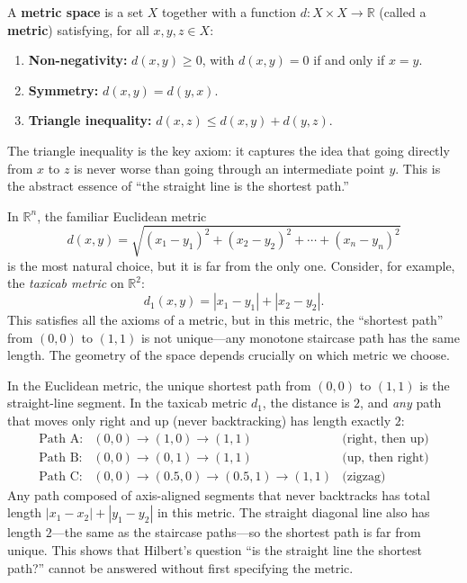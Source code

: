 \begin{definition}
A \textbf{metric space} is a set $X$ together with a function $d : X \times X \to \mathbb{R}$ (called a \textbf{metric}) satisfying, for all $x, y, z \in X$:
\begin{enumerate}
    \item \textbf{Non-negativity:} $d(x,y) \geq 0$, with $d(x,y) = 0$ if and only if $x = y$.
    \item \textbf{Symmetry:} $d(x,y) = d(y,x)$.
    \item \textbf{Triangle inequality:} $d(x,z) \leq d(x,y) + d(y,z)$.
\end{enumerate}
\end{definition}

The triangle inequality is the key axiom: it captures the idea that going directly from $x$ to $z$ is never worse than going through an intermediate point $y$. This is the abstract essence of ``the straight line is the shortest path.''

In $\mathbb{R}^n$, the familiar Euclidean metric
\[
    d(x,y) = \sqrt{(x_1 - y_1)^2 + (x_2 - y_2)^2 + \cdots + (x_n - y_n)^2}
\]
is the most natural choice, but it is far from the only one. Consider, for example, the \emph{taxicab metric} on $\mathbb{R}^2$:
\[
    d_1(x,y) = |x_1 - y_1| + |x_2 - y_2|.
\]
This satisfies all the axioms of a metric, but in this metric, the ``shortest path'' from $(0,0)$ to $(1,1)$ is not unique---any monotone staircase path has the same length. The geometry of the space depends crucially on which metric we choose.

\begin{example}
In the Euclidean metric, the unique shortest path from $(0,0)$ to $(1,1)$ is the straight-line segment. In the taxicab metric $d_1$, the distance is $2$, and \emph{any} path that moves only right and up (never backtracking) has length exactly $2$:
\[
\begin{array}{lll}
\text{Path A:} & (0,0) \to (1,0) \to (1,1) & \text{(right, then up)} \\
\text{Path B:} & (0,0) \to (0,1) \to (1,1) & \text{(up, then right)} \\
\text{Path C:} & (0,0) \to (0.5,0) \to (0.5,1) \to (1,1) & \text{(zigzag)}
\end{array}
\]
Any path composed of axis-aligned segments that never backtracks has total length $|x_1-x_2|+|y_1-y_2|$ in this metric. The straight diagonal line also has length $2$---the same as the staircase paths---so the shortest path is far from unique. This shows that Hilbert's question ``is the straight line the shortest path?'' cannot be answered without first specifying the metric.
\end{example}

